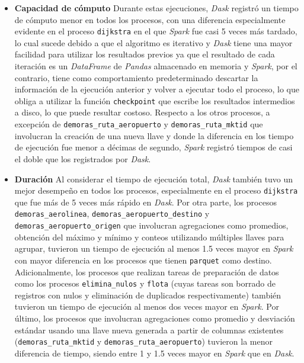 \begin{itemize}
	\item \textbf{Capacidad de cómputo} Durante estas ejecuciones, \textit{Dask} registró un tiempo de  cómputo menor en todos los procesos, con una diferencia especialmente evidente en el proceso \texttt{dijkstra} en el que \textit{Spark} fue casi 5 veces más tardado, lo cual sucede debido a que el algoritmo es iterativo y \textit{Dask} tiene una mayor facilidad para utilizar los resultados previos ya que el resultado de cada iteración es un \textit{DataFrame} de \textit{Pandas} almacenado en memoria y \textit{Spark}, por el contrario, tiene como comportamiento predeterminado descartar la información de la ejecución anterior y volver a ejecutar todo el proceso, lo que obliga a utilizar la función \texttt{checkpoint} que escribe los resultados intermedios a disco, lo que puede resultar costoso. Respecto a los otros procesos, a excepción de \texttt{demoras\_ruta\_aeropuerto} y \texttt{demoras\_ruta\_mktid} que involucran la creación de una nueva llave y donde la diferencia en los tiempo de ejecución fue menor a décimas de segundo, \textit{Spark} registró tiempos de casi el doble que los registrados por \textit{Dask}.
	
	\item \textbf{Duración} Al considerar el tiempo de ejecución total, \textit{Dask} también tuvo un mejor desempeño en todos los procesos, especialmente en el proceso \texttt{dijkstra} que fue más de 5 veces más rápido en \textit{Dask}. Por otra parte, los procesos \texttt{demoras\_aerolinea}, \texttt{demoras\_aeropuerto\_destino} y \texttt{demoras\_aeropuerto\_origen} que involucran agregaciones como promedios, obtención del máximo y mínimo y conteos utilizando múltiples llaves para agrupar, tuvieron un tiempo de ejecución al menos 1.5 veces mayor en \textit{Spark} con mayor diferencia en los procesos que tienen \texttt{parquet} como destino. Adicionalmente, los procesos que realizan tareas de preparación de datos como los procesos \texttt{elimina\_nulos} y \texttt{flota} (cuyas tareas son borrado de registros con nulos y eliminación de duplicados respectivamente) también tuvieron un tiempo de ejecución al menos dos veces mayor en \textit{Spark}. Por último, los procesos que involucran agregaciones como promedio y desviación estándar usando una llave nueva generada a partir de columnas existentes (\texttt{demoras\_ruta\_mktid} y \texttt{demoras\_ruta\_aeropuerto}) tuvieron la menor diferencia de tiempo, siendo entre 1 y 1.5 veces mayor en \textit{Spark} que en \textit{Dask}.  
	
\end{itemize}


